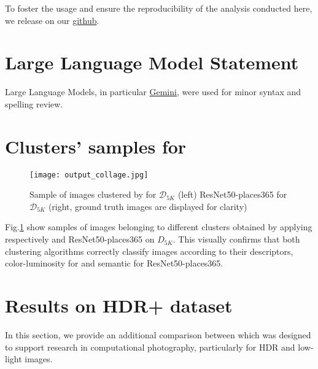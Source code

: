 \documentclass[12pt]{spieman}  %
\begin{document}
\begin{spacing}{2}
\begin{linenumbers}
To foster the usage and ensure the reproducibility of the analysis conducted here, we release \clustname on our \href{https://github.com/GiuliaBonino/CARDIE}{github}. 


\section*{Large Language Model Statement}
\label{app:llms}

Large Language Models, in particular \href{https://gemini.google.com/}{Gemini}, were used for minor syntax and spelling review. 





\newpage	


\appendix
\section{Clusters' samples for \clustname}
\label{app:cluster_sample}

\begin{figure}[!t]
	\centering
	\texttt{[image: output\_collage.jpg]}
	
	\caption{Sample of images clustered by \clustname for $\mathcal{D}_{5K}$ (left) ResNet50-places365  for $\mathcal{D}_{5K}$ (right, ground truth images are displayed for clarity)}
	\label{fig:clusters_clustname}
\end{figure}

Fig.\ref{fig:clusters_clustname}  show samples of images belonging to different clusters obtained by applying respectively \clustname and  ResNet50-places365 on ${D}_{5K}$. This visually confirms that both clustering algorithms correctly classify images according to their descriptors, color-luminosity for \clustname and semantic for ResNet50-places365.   


\section{Results on HDR+ dataset}
\label{app:hdrplus}






{In this section, we provide an additional comparison between}  \cite{hasinoff2016burst}  {which was designed to support research in computational photography, particularly for HDR  and low-light images.}



\end{linenumbers}
\end{spacing}
\end{document}
